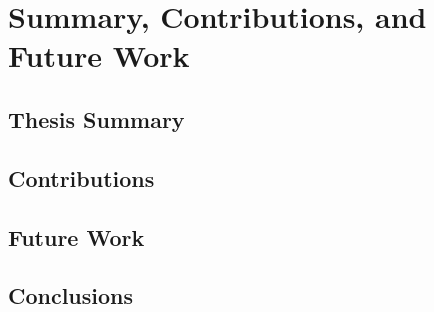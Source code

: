 \chapter{Summary, Contributions, and Future Work}

\section{Thesis Summary}

\section{Contributions}

\section{Future Work}

\section{Conclusions}
